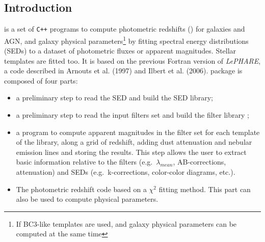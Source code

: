 \documentclass[12pt]{article}
\begin{document}
\subsection{Introduction}\label{subsect:introduction}
%
%
\lp is a set of \texttt{C++} programs to compute
 photometric redshifts (\zphot) for galaxies and AGN, and galaxy physical parameters\footnote{If BC3-like templates are used, \zphot and galaxy physical parameters can be computed at the same time} by fitting spectral energy distributions (SEDs) to a dataset of photometric fluxes or apparent magnitudes.  Stellar templates are fitted too.
 It is based on the previous Fortran version of \textit{LePHARE}, a code described 
 in Arnouts et al. (1997) and Ilbert et al. (2006).
 \lp package is composed of four parts:
 \begin{itemize}
 \item a preliminary step to read the SED and build the SED library;
 \item a preliminary step to read the  input filters set and build the filter library ;
 \item a program to compute apparent magnitudes in the filter set for each template of the library,
 along a grid of redshift, adding dust attenuation and nebular emission lines and storing the results. 
 This step  allows the user to  extract  basic information relative to 
  the filters (e.g.~$\lambda_{mean}$, AB-corrections, attenuation)
  and SEDs (e.g.~k-corrections, color-color diagrams, etc.). 
 \item  The photometric redshift code based on a  $\chi^2$ fitting method. This part can also be used to compute physical parameters.
\end{itemize}


%
%
\end{document}

